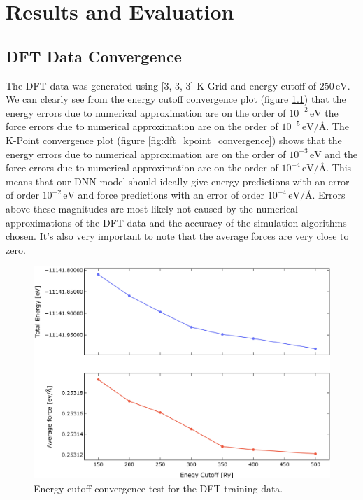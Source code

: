 \chapter{Results and Evaluation}
\label{chap:results-and-evaluation}

\section{DFT Data Convergence}

The DFT data was generated using [3, 3, 3] K-Grid and energy cutoff of
$250 \, \mathrm{eV}$. We can clearly see from the energy cutoff convergence
plot (figure \ref{fig:dft_energy_cutoff_convergence}) that the energy errors
due to numerical approximation are on the order of $10^{-2} \, \mathrm{eV}$
the force errors due to numerical approximation are on the order of
$10^{-5} \, \mathrm{eV}/\text{\AA}$. The K-Point convergence plot
(figure \ref{fig:dft_kpoint_convergence}) shows that the energy errors due to
numerical approximation are on the order of $10^{-3} \, \mathrm{eV}$ and the
force errors due to numerical approximation are on the order of
$10^{-4} \, \mathrm{eV}/\text{\AA}$. This means that our DNN model should
ideally give energy predictions with an error of order
$10^{-2} \, \mathrm{eV}$ and force predictions with an error of order
$10^{-4} \, \mathrm{eV}/\text{\AA}$. Errors above these magnitudes are most
likely not caused by the numerical approximations of the DFT data and the
accuracy of the simulation algorithms chosen. It's also very important to note
that the average forces are very close to zero.

\begin{figure}
  \begin{center}
    \includegraphics[width=.8\textwidth]{
      asset/cutoff_convergence.jpg
    }
  \end{center}
  \caption{Energy cutoff convergence test for the DFT training data.}
  \label{fig:dft_energy_cutoff_convergence}
\end{figure}

